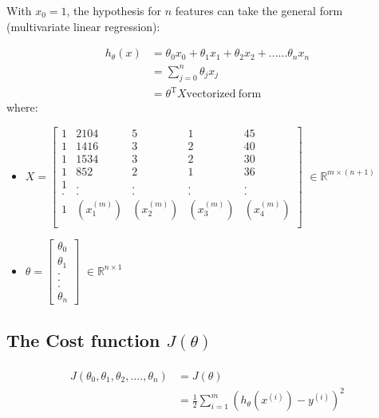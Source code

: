 \documentclass[a4paper,12pt]{report}
\begin{document}
With $x_0=1$, the hypothesis for $n$ features can take the general form (multivariate linear regression):		

\begin{equation}
	\begin{split}
			\label{h_multi} 
			    h_{\theta}(x) & = \theta_0 x_0 + \theta_1 x_1 + \theta_2 x_2 + ...... \theta_n x_n \\
					              & = \sum _{j=0} ^{n} \theta_j x_j \\
												& = \theta ^{\mathrm{T}} X   \mathrm{vectorized \ form}
		\end{split}
\end{equation}
where:
\begin{itemize}
\item 
$X = \left[ \begin{smallmatrix} 1 & 2104   & 5 & 1 & 45\\
 1 & 1416   & 3 & 2 & 40\\
 1 & 1534   & 3 & 2 & 30\\
 1 & 852    & 2 & 1 & 36\\
 1 & . &. & . & . \\
 . &. &. & . & . \\
1 & (x_1 ^{(m)}) & (x_2 ^{(m)}) & (x_3 ^{(m)}) & (x_4 ^{(m)})\\
 \end{smallmatrix} \right]$   $\in \mathbb{R} ^ {m \times (n+1)}$
\item $\theta = \left[ \begin{smallmatrix} \theta_0 \\ \theta_1 \\ . \\ . \\ . \\ \theta_n \end{smallmatrix} \right]$   $\in \mathbb{R} ^ {n \times 1}$
\end{itemize}

\subsection{ The Cost function $J(\theta)$}
\begin{align*}
	\begin{split}
				J(\theta_0, \theta_1, \theta_2,...., \theta_n) & = J(\theta) \\
				                                               & = \frac{1}{2} \sum _{i=1} ^m \left( h_{\theta}(x^{(i)}) - y^{(i)} \right)^2
	\end{split}
\end {align*}
\end{document}
